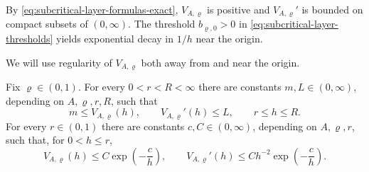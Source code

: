 \documentclass[11pt,reqno,a4paper]{article}
\begin{document}
By \cref{eq:subcritical-layer-formulas-exact}, $V_{A,\varrho}$ is positive and
$V_{A,\varrho}'$ is bounded on compact subsets of $(0,\infty)$. The threshold
$b_{\varrho,0}>0$ in \cref{eq:subcritical-layer-thresholds} yields exponential
decay in $1/h$ near the origin.

We will use regularity of $V_{A,\varrho}$ both away from and near
the origin.
\begin{lemma}
\label{lem:subcritical-fixed-precision-map-estimates}
  Fix $\varrho\in(0,1)$. For every $0<r<R<\infty$ there are constants
  $m,L\in(0,\infty)$, depending on $A,\varrho,r,R$, such that
  \begin{equation}\label{eq:subcritical-fixed-compact-bounds}
    m\leq V_{A,\varrho}(h),
    \qquad
    V_{A,\varrho}'(h)\leq L,
    \qquad r\leq h\leq R .
  \end{equation}
  For every $r\in(0,1)$ there are constants $c,C\in(0,\infty)$, depending on
  $A,\varrho,r$, such that, for $0<h\leq r$,
  \begin{equation}\label{eq:subcritical-fixed-small-radius-map-derivative}
    V_{A,\varrho}(h)
    \leq
    C\exp\left(-\frac c h\right),
    \qquad
    V_{A,\varrho}'(h)
    \leq
    Ch^{-2}\exp\left(-\frac c h\right).
  \end{equation}
\end{lemma}
\end{document}
